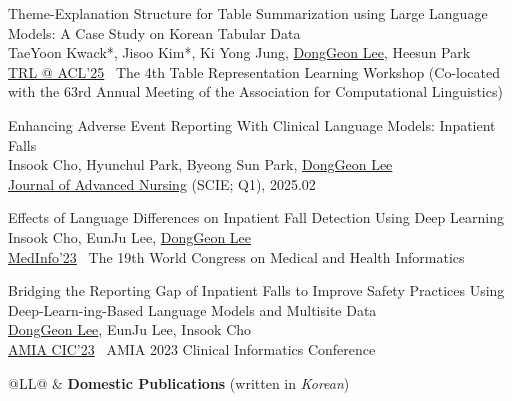 \documentclass[11pt,a4paper]{article}
\newlength{\leftcolumn}
\newlength{\rightcolumn}
\newlength{\midrightcolumn}
\newcounter{pubnum}
\newenvironment{publications}
{\begin{list}{}
    {\setlength{\leftmargin}{1.35in}
     \setlength{\itemsep}{0.5em}
     \setlength{\labelsep}{0em}
     \renewcommand{\makelabel}[1]{##1}}}
{\end{list}}
\newcommand{\pubitem}[1]{%
    \addtocounter{pubnum}{-1}%
    \item[\textup{[\arabic{pubnum}]}] #1%
}
\begin{document}
\begin{publications}
\pubitem{
    Theme-Explanation Structure for Table Summarization using Large Language Models: A Case Study on Korean Tabular Data \\
        TaeYoon Kwack*, Jisoo Kim*, Ki Yong Jung, \underline{DongGeon Lee}, Heesun Park  \\[3pt]
        \href{https://aclanthology.org/2025.trl-1.1/}{TRL @ ACL'25} \textbar\ The 4th Table Representation Learning Workshop (Co-located with the 63rd Annual Meeting of the Association for Computational Linguistics)
}

\pubitem{
    Enhancing Adverse Event Reporting With Clinical Language Models: Inpatient Falls\\
        Insook Cho, Hyunchul Park, Byeong Sun Park, \underline{DongGeon Lee} \\[3pt]
        \href{https://doi.org/10.1111/jan.16812}{Journal of Advanced Nursing} (SCIE; Q1), 2025.02
}

\pubitem{
    Effects of Language Differences on Inpatient Fall Detection Using Deep Learning \\
        Insook Cho, EunJu Lee, \underline{DongGeon Lee}\\[3pt]
        \href{https://pubmed.ncbi.nlm.nih.gov/38426881/}{MedInfo'23} \textbar\ The 19th World Congress on Medical and Health Informatics
}

\pubitem{
    Bridging the Reporting Gap of Inpatient Falls to Improve Safety Practices Using Deep-Learn-ing-Based Language Models and Multisite Data \\
        \underline{DongGeon Lee}, EunJu Lee, Insook Cho\\[3pt]
        \href{https://s4.goeshow.com/amia/cic/2023/schedule_at_a_glance.cfm?session_key=00DF797E-CE00-F26D-04E7-70E1ABCC96E1\&session_date=Thursday,\%20May\%2025,\%202023}{AMIA CIC'23} \textbar\ AMIA 2023 Clinical Informatics Conference
}

\end{publications}
\vspace{0.5em}

\begin{tabular}{@{}L{\leftcolumn}L{\midrightcolumn}@{}}
\textcolor{sectioncolor}{} & \textbf{Domestic Publications} (written in \textit{Korean})
\end{tabular}
\vspace{-0.5em}
\end{document}
